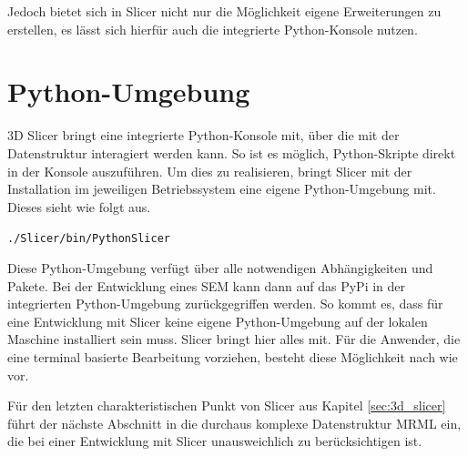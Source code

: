 Jedoch bietet sich in Slicer nicht nur die Möglichkeit eigene Erweiterungen zu
erstellen, es lässt sich hierfür auch die integrierte Python-Konsole nutzen.

\section{Python-Umgebung}
\label{subsec:pythob_umgebung} 3D Slicer bringt eine integrierte Python-Konsole mit,
über die mit der Datenstruktur interagiert werden kann. So ist es möglich,
Python-Skripte direkt in der Konsole auszuführen. Um dies zu realisieren, bringt
Slicer mit der Installation im jeweiligen Betriebssystem eine eigene Python-Umgebung
mit. Dieses sieht wie folgt aus.

\begin{center}
	\texttt{./Slicer/bin/PythonSlicer}
\end{center}

Diese Python-Umgebung verfügt über alle notwendigen Abhängigkeiten und Pakete. Bei
der Entwicklung eines \ac{SEM} kann dann auf das \ac{PyPi} in der integrierten Python-Umgebung
zurückgegriffen werden. So kommt es, dass für eine Entwicklung mit Slicer keine eigene
Python-Umgebung auf der lokalen Maschine installiert sein muss. Slicer bringt
hier alles mit. Für die Anwender, die eine terminal basierte Bearbeitung
vorziehen, besteht diese Möglichkeit nach wie vor.

Für den letzten charakteristischen Punkt von Slicer aus Kapitel \ref{sec:3d_slicer}
führt der nächste Abschnitt in die durchaus komplexe Datenstruktur \ac{MRML} ein,
die bei einer Entwicklung mit Slicer unausweichlich zu berücksichtigen ist.

